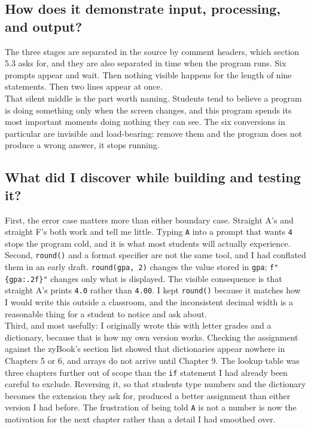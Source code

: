 \documentclass[11pt]{article}
\begin{document}
\subsection{How does it demonstrate input, processing, and output?}
\label{sec:org05f26bb}

The three stages are separated in the source by comment headers, which section 5.3 asks for, and they are also separated in time when the program runs. Six prompts appear and wait. Then nothing visible happens for the length of nine statements. Then two lines appear at once.\\

That silent middle is the part worth naming. Students tend to believe a program is doing something only when the screen changes, and this program spends its most important moments doing nothing they can see. The six conversions in particular are invisible and load-bearing: remove them and the program does not produce a wrong answer, it stops running.\\
\subsection{What did I discover while building and testing it?}
\label{sec:org5cfbc61}

First, the error case matters more than either boundary case. Straight A's and straight F's both work and tell me little. Typing \texttt{A} into a prompt that wants \texttt{4} stops the program cold, and it is what most students will actually experience.\\

Second, \texttt{round()} and a format specifier are not the same tool, and I had conflated them in an early draft. \texttt{round(gpa, 2)} changes the value stored in \texttt{gpa}; \texttt{f"\{gpa:.2f\}"} changes only what is displayed. The visible consequence is that straight A's prints \texttt{4.0} rather than \texttt{4.00}. I kept \texttt{round()} because it matches how I would write this outside a classroom, and the inconsistent decimal width is a reasonable thing for a student to notice and ask about.\\

Third, and most usefully: I originally wrote this with letter grades and a dictionary, because that is how my own version works. Checking the assignment against the zyBook's section list showed that dictionaries appear nowhere in Chapters 5 or 6, and arrays do not arrive until Chapter 9. The lookup table was three chapters further out of scope than the \texttt{if} statement I had already been careful to exclude. Reversing it, so that students type numbers and the dictionary becomes the extension they ask for, produced a better assignment than either version I had before. The frustration of being told \texttt{A} is not a number is now the motivation for the next chapter rather than a detail I had smoothed over.\\
\end{document}
